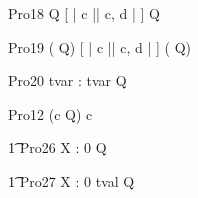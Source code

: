 \begin{circus}
    \circprocess Pro18 \circdef  {} \rcirctime \circstartby Q [ | \lchanset c \rchanset || \lchanset c, d \rchanset | ]   \rcirctime \circstartby Q \\
\end{circus}
 
\begin{circus}
    \circprocess Pro19 \circdef (  \rcirctime \circstartby Q) [ | \lchanset c \rchanset || \lchanset c, d \rchanset | ] (  \rcirctime \circstartby Q) \\
\end{circus}



\begin{circus}
    \circprocess Pro20 \circdef \circvres tvar : \nat  \circspot  \lcirctime tvar \rcirctime \circstartby Q\\
\end{circus}   


\begin{circus}
    \circprocess Pro12 \circdef (c \then  {} \rcirctime \circstartby Q) \circhide c \\
\end{circus} 
     
\begin{circus}
    \t1 Pro26 \circdef \lcirctime X : 0  \rcirctime \circstartby Q\\
\end{circus}        

\begin{circus}
    \t1 Pro27 \circdef \lcirctime X : 0 \upto tval \rcirctime \circstartby Q \\
\end{circus} 
